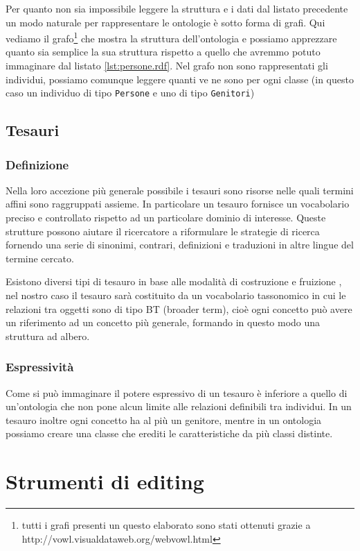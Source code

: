 Per quanto non sia impossibile leggere la struttura e i dati dal listato precedente un modo naturale per rappresentare le ontologie è sotto forma di grafi. Qui vediamo il grafo\footnote{tutti i grafi presenti un questo elaborato sono stati ottenuti grazie a http://vowl.visualdataweb.org/webvowl.html} che mostra la struttura dell'ontologia e possiamo apprezzare quanto sia semplice la sua struttura rispetto a quello che avremmo potuto immaginare dal listato \ref{lst:persone.rdf}. Nel grafo non sono rappresentati gli individui, possiamo comunque leggere quanti ve ne sono per ogni classe (in questo caso un individuo di tipo \verb|Persone| e uno di tipo \verb|Genitori|)


\subsection{Tesauri}
\subsubsection{Definizione}
Nella loro accezione più generale possibile i tesauri sono risorse nelle quali termini affini sono raggruppati assieme\cite{kilgarriff2000s}. In particolare un tesauro fornisce un vocabolario preciso e controllato rispetto ad un particolare dominio di interesse.\cite{srinivasan1992thesaurus} Queste strutture possono aiutare il ricercatore a riformulare le strategie di ricerca fornendo una serie di sinonimi, contrari, definizioni e traduzioni in altre lingue del termine cercato.

Esistono diversi tipi di tesauro in base alle modalità di costruzione e fruizione \cite{kilgarriff2000s}, nel nostro caso il tesauro sarà costituito da un vocabolario tassonomico in cui le relazioni tra oggetti sono di tipo BT (broader term), cioè ogni concetto può avere un riferimento ad un concetto più generale, formando in questo modo una struttura ad albero. 
\subsubsection{Espressività}
Come si può immaginare il potere espressivo di un tesauro è inferiore a quello di un'ontologia che non pone alcun limite alle relazioni definibili tra individui. In un tesauro inoltre ogni concetto ha al più un genitore, mentre in un ontologia possiamo creare una classe che erediti le caratteristiche da più classi distinte.
\section{Strumenti di editing}

